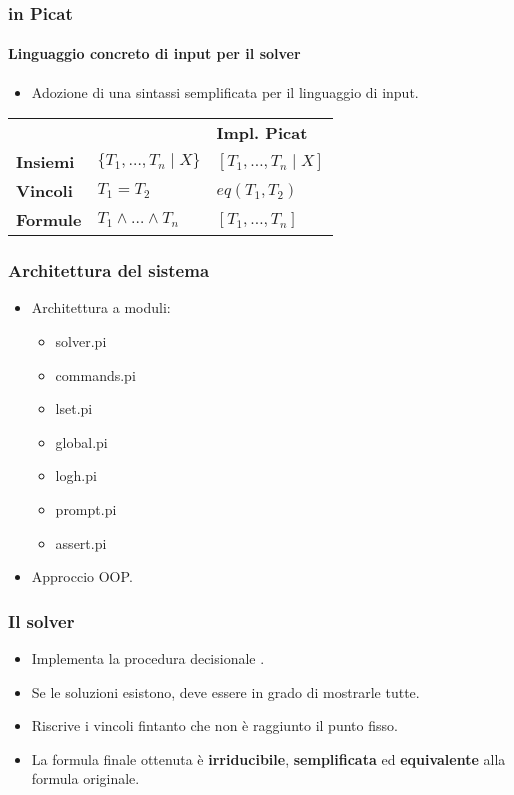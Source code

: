 \documentclass{beamer}
\begin{document}
\begin{frame}
  \frametitle{\lset{} in Picat}
  \framesubtitle{Linguaggio concreto di input per il solver}
  \begin{itemize}
  \item Adozione di una sintassi semplificata per il linguaggio di input.
  \end{itemize}
  \begin{table}
    \begin{tabular}{l l l}
      & \textbf{\lset{}} & \textbf{Impl. Picat}\\
      \addlinespace
      \textbf{Insiemi} & $\{T_1, \ldots, T_n \mid X\}$ & $[T_1, \ldots, T_n \mid X]$ \\
      \textbf{Vincoli} & $T_1 = T_2$ & $eq(T_1, T_2)$ \\
      \textbf{Formule} & $T_1 \land \ldots \land T_n$ & $[T_1, \ldots, T_n]$ \\
    \end{tabular}
  \end{table}
\end{frame}


\begin{frame}
  \frametitle{Architettura del sistema}
  \begin{itemize}
  \item Architettura a moduli:
    \begin{itemize}
    \item solver.pi
    \item commands.pi
    \item lset.pi
    \item global.pi
    \item log\textunderscore h.pi
    \item prompt.pi
    \item assert.pi
    \end{itemize}
  \item Approccio OOP.
  \end{itemize}
\end{frame}


\begin{frame}
  \frametitle{Il solver}
  \begin{itemize}
  \item Implementa la procedura decisionale \satset{}.
  \item Se le soluzioni esistono, deve essere in grado di mostrarle tutte.
  \item Riscrive i vincoli fintanto che non è raggiunto il punto fisso.
  \item La formula finale ottenuta è \textbf{irriducibile}, \textbf{semplificata} ed \textbf{equivalente} alla formula originale.
  \end{itemize}
\end{frame}
\end{document}
